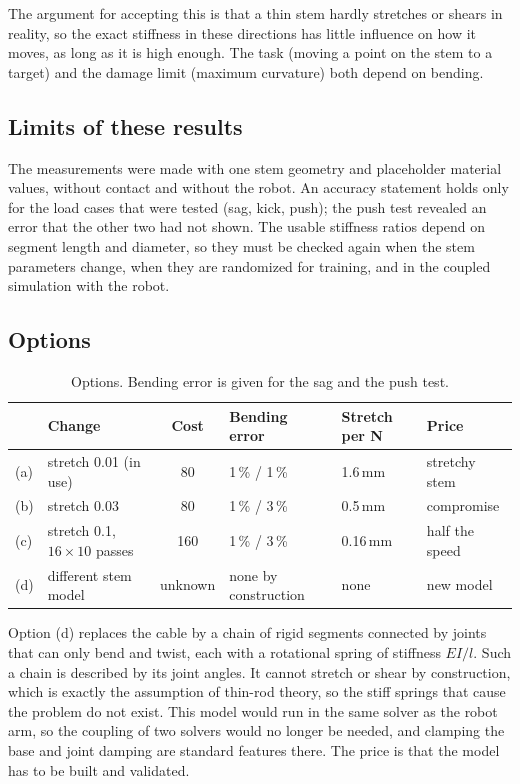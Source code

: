 The argument for accepting this is that a thin stem hardly stretches or shears in reality, so the exact
stiffness in these directions has little influence on how it moves, as long as it is high enough. The task
(moving a point on the stem to a target) and the damage limit (maximum curvature) both depend on bending.

\subsection{Limits of these results}

The measurements were made with one stem geometry and placeholder material values, without contact and
without the robot. An accuracy statement holds only for the load cases that were tested (sag, kick, push);
the push test revealed an error that the other two had not shown. The usable stiffness ratios depend on
segment length and diameter, so they must be checked again when the stem parameters change, when they are
randomized for training, and in the coupled simulation with the robot.

\subsection{Options}

\begin{table}[h]
  \centering
  \caption{Options. Bending error is given for the sag and the push test.}
  \label{tab:stem-options}
  \begin{tabular}{llclll}
    \toprule
     & Change & Cost & Bending error & Stretch per N & Price \\
    \midrule
    (a) & stretch 0.01 (in use) & 80  & 1\,\% / 1\,\%  & 1.6\,mm  & stretchy stem \\
    (b) & stretch 0.03          & 80  & 1\,\% / 3\,\%  & 0.5\,mm  & compromise \\
    (c) & stretch 0.1, $16 \times 10$ passes & 160 & 1\,\% / 3\,\% & 0.16\,mm & half the speed \\
    (d) & different stem model          & unknown & none by construction & none & new model \\
    \bottomrule
  \end{tabular}
\end{table}

Option (d) replaces the cable by a chain of rigid segments connected by joints that can only bend and
twist, each with a rotational spring of stiffness $EI/l$. Such a chain is described by its joint angles. It
cannot stretch or shear by construction, which is exactly the assumption of thin-rod theory, so the stiff
springs that cause the problem do not exist. This model would run in the same solver as the robot arm, so
the coupling of two solvers would no longer be needed, and clamping the base and joint damping are
standard features there. The price is that the model has to be built and validated.

